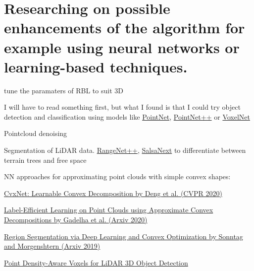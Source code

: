 \chapter{Researching on possible enhancements of the algorithm for example using neural networks or learning-based techniques.\label{chap:enhancements}}

tune the paramaters of RBL to suit 3D

I will have to read something first, but what I found is that I could try object detection and classification using models like \href{https://arxiv.org/abs/1612.00593}{PointNet}, \href{https://arxiv.org/abs/1706.02413}{PointNet++} or \href{https://arxiv.org/abs/1711.06396}{VoxelNet}

Pointcloud denoising

Segmentation of LiDAR data.
\href{https://www.ipb.uni-bonn.de/wp-content/papercite-data/pdf/milioto2019iros.pdf}{RangeNet++}, \href{https://arxiv.org/abs/2003.03653}{SalsaNext} to differentiate between terrain trees and free space

NN approaches for approximating point clouds with simple convex shapes:

\href{https://openaccess.thecvf.com/content_CVPR_2020/papers/Deng_CvxNet_Learnable_Convex_Decomposition_CVPR_2020_paper.pdf}{CvxNet: Learnable Convex Decomposition by Deng et al. (CVPR 2020)}

\href{https://arxiv.org/abs/2003.13834}{Label-Efficient Learning on Point Clouds using Approximate Convex Decompositions by Gadelha et al. (Arxiv 2020)}

\href{https://arxiv.org/abs/1911.12870}{Region Segmentation via Deep Learning and Convex Optimization by Sonntag and Morgenshtern (Arxiv 2019)}

\href{https://arxiv.org/abs/2203.05662}{Point Density-Aware Voxels for LiDAR 3D Object Detection}